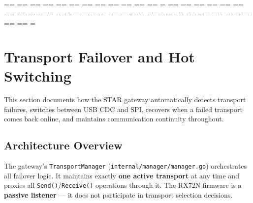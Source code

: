     == == == == == == == == == == == ==
    = %
      == == == == == == == == == == == == == == == == == == == == == == == == ==
      == ==
    =

\newpage
\section{Transport Failover and Hot Switching
}
\label{sec : transport - failover}

This section documents how the STAR gateway automatically detects transport
    failures,
    switches between USB CDC and SPI,
    recovers when a failed transport comes back online,
    and maintains communication continuity throughout.

\subsection{Architecture Overview}

        The gateway's \texttt{TransportManager} (\texttt{internal/manager/manager.go}) orchestrates all failover logic. It maintains exactly \textbf{one active transport} at any time and proxies all \texttt{Send()}/\texttt{Receive()} operations through it. The RX72N firmware is a \textbf{passive listener} --- it does not participate in transport selection decisions.

\vspace {
  0.3cm
}

